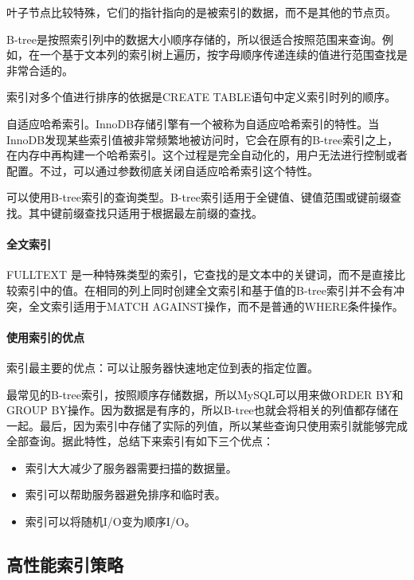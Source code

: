 叶子节点比较特殊，它们的指针指向的是被索引的数据，而不是其他的节点页。

B-tree是按照索引列中的数据大小顺序存储的，所以很适合按照范围来查询。例如，在一个基于文本列的索引树上遍历，按字母顺序传递连续的值进行范围查找是非常合适的。

索引对多个值进行排序的依据是CREATE TABLE语句中定义索引时列的顺序。

自适应哈希索引。InnoDB存储引擎有一个被称为自适应哈希索引的特性。当InnoDB发现某些索引值被非常频繁地被访问时，它会在原有的B-tree索引之上，在内存中再构建一个哈希索引。这个过程是完全自动化的，用户无法进行控制或者配置。不过，可以通过参数彻底关闭自适应哈希索引这个特性。

可以使用B-tree索引的查询类型。B-tree索引适用于全键值、键值范围或键前缀查找。其中键前缀查找只适用于根据最左前缀的查找。

\paragraph*{全文索引}

FULLTEXT 是一种特殊类型的索引，它查找的是文本中的关键词，而不是直接比较索引中的值。在相同的列上同时创建全文索引和基于值的B-tree索引并不会有冲突，全文索引适用于MATCH AGAINST操作，而不是普通的WHERE条件操作。

\paragraph*{使用索引的优点}

索引最主要的优点：可以让服务器快速地定位到表的指定位置。

最常见的B-tree索引，按照顺序存储数据，所以MySQL可以用来做ORDER BY和GROUP BY操作。因为数据是有序的，所以B-tree也就会将相关的列值都存储在一起。最后，因为索引中存储了实际的列值，所以某些查询只使用索引就能够完成全部查询。据此特性，总结下来索引有如下三个优点：

\begin{itemize}
    \item 索引大大减少了服务器需要扫描的数据量。
    \item 索引可以帮助服务器避免排序和临时表。
    \item 索引可以将随机I/O变为顺序I/O。
\end{itemize}

\subsection{高性能索引策略}

